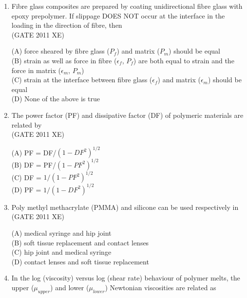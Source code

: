 \documentclass[journal,12pt,onecolumn]{IEEEtran}
\begin{document}
\begin{enumerate}[label=\arabic*)]
\item Fibre glass composites are prepared by coating unidirectional fibre glass with epoxy prepolymer. If slippage DOES NOT occur at the interface in the loading in the direction of fibre, then\\

\hfill{(GATE 2011 XE)} \\
\begin{multicols}{2}
(A) force sheared by fibre glass ($P_f$) and matrix ($P_m$) should be equal\\
(B) strain as well as force in fibre ($\epsilon_f$, $P_f$) are both equal to strain and the force in matrix ($\epsilon_m$, $P_m$)\\
(C) strain at the interface between fibre glass ($\epsilon_f$) and matrix ($\epsilon_m$) should be equal\\
(D) None of the above is true
\end{multicols}

\item The power factor (PF) and dissipative factor (DF) of polymeric materials are related by\\

\hfill{(GATE 2011 XE)} \\
\begin{multicols}{4}
(A) PF = DF/$(1 - DF^2)^{1/2}$\\
(B) DF = PF/$(1 - PF^2)^{1/2}$\\
(C) DF = $1/(1 - PF^2)^{1/2}$\\
(D) PF = $1/(1 - DF^2)^{1/2}$
\end{multicols}

\item Poly methyl methacrylate (PMMA) and silicone can be used respectively in\\

\hfill{(GATE 2011 XE)} \\
\begin{multicols}{2}
(A) medical syringe and hip joint\\
(B) soft tissue replacement and contact lenses\\
(C) hip joint and medical syringe\\
(D) contact lenses and soft tissue replacement
\end{multicols}

\item In the log (viscosity) versus log (shear rate) behaviour of polymer melts, the upper ($\mu_{upper}$) and lower ($\mu_{lower}$) Newtonian viscosities are related as\\


\end{enumerate}
\end{document}
